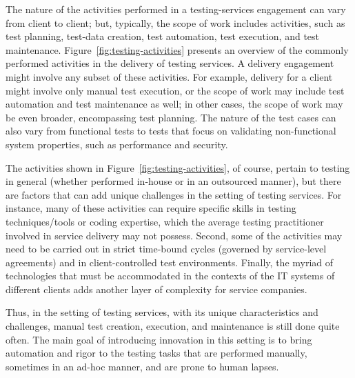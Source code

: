 The nature of the activities performed in a testing-services engagement can vary
from client to client; but, typically, the scope of work includes activities,
such as test planning, test-data creation, test automation, test execution, and
test maintenance. Figure~\ref{fig:testing-activities} presents an overview of
the commonly performed activities in the delivery of testing services. A
delivery engagement might involve any subset of these activities. For example,
delivery for a client might involve only manual test execution, or the scope of
work may include test automation and test maintenance as well; in other cases,
the scope of work may be even broader, encompassing test planning. The nature of
the test cases can also vary from functional tests to tests that focus on
validating non-functional system properties, such as performance and security.

The activities shown in Figure~\ref{fig:testing-activities}, of course, pertain
to testing in general (whether performed in-house or in an outsourced manner),
but there are factors that can add unique challenges in the setting of testing
services. For instance, many of these activities can require specific skills in
testing techniques/tools or coding expertise, which the average testing
practitioner involved in service delivery may not possess. Second, some of the
activities may need to be carried out in strict time-bound cycles (governed by
service-level agreements) and in client-controlled test environments. Finally,
the myriad of technologies that must be accommodated in the contexts of the IT
systems of different clients adds another layer of complexity for service
companies.

Thus, in the setting of testing services, with its unique characteristics and
challenges, manual test creation, execution, and maintenance is still done quite
often.  The main goal of introducing innovation in this setting is to bring
automation and rigor to the testing tasks that are performed manually, sometimes
in an ad-hoc manner, and are prone to human lapses.

